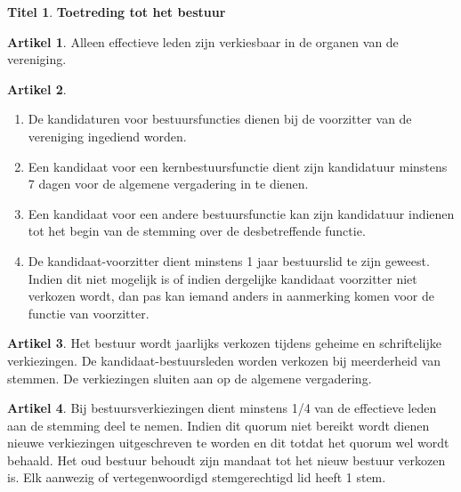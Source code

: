 \documentclass[a4paper,10pt]{article}
\theoremstyle{definition}
\newtheorem{titel}{\newline\Large Titel}
\newtheorem{artikelbase}{\large Artikel}
\newenvironment{artikel}
  {\begin{artikelbase}}
  {\smallskip
   \end{artikelbase}}
\newcommand{\ttext}[1]{\Large \textbf{#1} \normalsize}
\newcommand{\ttextcr}{\hfill\newline}
\newcommand{\ttextenum}{\mbox{}}
\begin{document}
\begin{titel}\ttext{Toetreding tot het bestuur}

  \begin{artikel}\ttextcr
    Alleen effectieve leden zijn verkiesbaar in de organen van de vereniging.
  \end{artikel}

  \begin{artikel}\ttextenum
    \begin{enumerate}
      \item
        De kandidaturen voor bestuursfuncties dienen bij de voorzitter van de vereniging ingediend worden.
      \item
        Een kandidaat voor een kernbestuursfunctie dient zijn kandidatuur minstens 7 dagen voor de algemene vergadering in te dienen.
      \item
        Een kandidaat voor een andere bestuursfunctie kan zijn kandidatuur indienen tot het begin van de stemming over de desbetreffende functie.
      \item
        De kandidaat-voorzitter dient minstens 1 jaar bestuurslid te zijn geweest.
        Indien dit niet mogelijk is of indien dergelijke kandidaat voorzitter niet verkozen wordt, dan pas kan iemand anders in aanmerking komen voor de functie van voorzitter.
    \end{enumerate}
  \end{artikel}

  \begin{artikel}\ttextcr
    Het bestuur wordt jaarlijks verkozen tijdens geheime en schriftelijke verkiezingen.
    De kandidaat-bestuursleden worden verkozen bij meerderheid van stemmen.
    De verkiezingen sluiten aan op de algemene vergadering.
  \end{artikel}

  \begin{artikel}\ttextcr
    Bij bestuursverkiezingen dient minstens 1/4 van de effectieve leden aan de stemming deel te nemen.
    Indien dit quorum niet bereikt wordt dienen nieuwe verkiezingen uitgeschreven te worden en dit totdat het quorum wel wordt behaald.
    Het oud bestuur behoudt zijn mandaat tot het nieuw bestuur verkozen is.
    Elk aanwezig of vertegenwoordigd stemgerechtigd lid heeft 1 stem.
  \end{artikel}


\end{titel}
\end{document}
